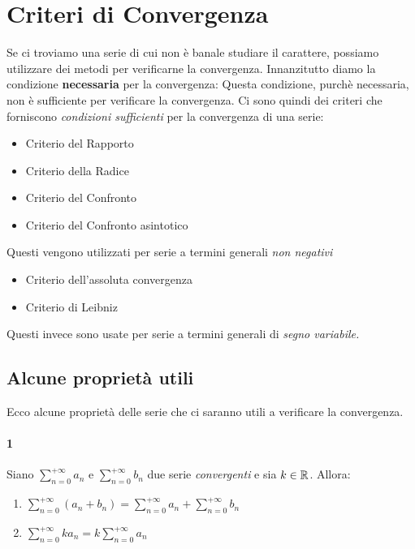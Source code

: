 \documentclass[12pt, a4paper, openany]{book}
\begin{document}
	\section{Criteri di Convergenza}
	Se ci troviamo una serie di cui non è banale studiare il carattere, possiamo utilizzare dei metodi per verificarne la convergenza.
	Innanzitutto diamo la condizione \textbf{necessaria} per la convergenza:
	Questa condizione, purchè necessaria, non è sufficiente per verificare la convergenza.
	Ci sono quindi dei criteri che forniscono \emph{condizioni sufficienti} per la convergenza di una serie:

	\begin{itemize}
		\item Criterio del Rapporto
		\item Criterio della Radice
		\item Criterio del Confronto
		\item Criterio del Confronto asintotico
	\end{itemize}
	Questi vengono utilizzati per serie a termini generali \emph{non negativi}
	\begin{itemize}
		\item Criterio dell'assoluta convergenza
		\item Criterio di Leibniz
	\end{itemize}
	Questi invece sono usate per serie a termini generali di \emph{segno variabile.}

	\subsection{Alcune proprietà utili}
	Ecco alcune proprietà delle serie che ci saranno utili a verificare la convergenza.

	\paragraph*{1}Siano $\sum_{n=0}^{+\infty}a_n$ e $\sum_{n=0}^{+\infty}b_n$ due serie \emph{convergenti} e sia $k\in\mathbb{R}$.
	Allora:
	\begin{enumerate}
		\item $\sum_{n=0}^{+\infty}(a_n + b_n) = \sum_{n=0}^{+\infty}a_n + \sum_{n=0}^{+\infty}b_n$
		\item $\sum_{n=0}^{+\infty} k a_n = k \sum_{n=0}^{+\infty}a_n$
	\end{enumerate}
\end{document}
